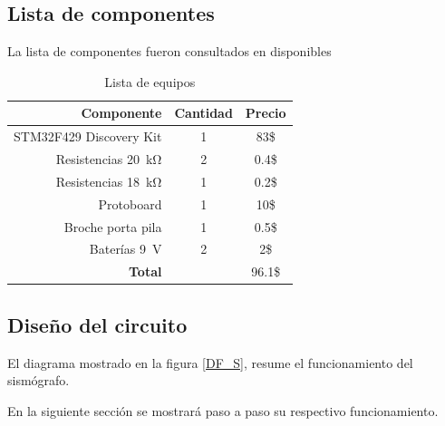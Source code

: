 \subsection*{Lista de componentes}
La lista de componentes fueron consultados en \cite{web2} disponibles
\begin{table}[H]
\caption{Lista de equipos}
\label{table_2}
\begin{center}
\begin{tabular}{r|cc}
\hline
\textbf{Componente}&\textbf{Cantidad}&\textbf{Precio}\\
 \hline
STM32F429 Discovery Kit& 1 & 83\$ \\ \hline 
Resistencias \SI{20}{\kilo\ohm}&2 & 0.4\$ \\ \hline 
Resistencias \SI{18}{\kilo\ohm}&1 & 0.2\$ \\ \hline 
Protoboard &1 &10\$ \\ \hline 
Broche porta pila &1 &0.5\$ \\ \hline 
Baterías \SI{9}{\volt} & 2& 2\$ \\ \hline 

 \textbf{Total}& & 96.1\$ \\
 \hline
\end{tabular}
\end{center}
\end{table}

\subsection*{Diseño del circuito}
El diagrama mostrado en la figura \ref{DF_S}, resume el funcionamiento del sismógrafo.

En la siguiente sección se mostrará paso a paso su respectivo funcionamiento.
\newpage
